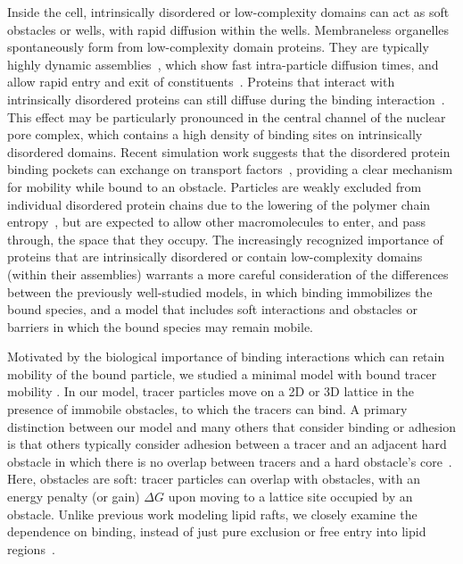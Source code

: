 Inside the cell, intrinsically disordered or low-complexity domains can act as
soft obstacles or wells, with rapid diffusion within the wells.  Membraneless
organelles spontaneously form from low-complexity domain proteins. They are
typically highly dynamic assemblies~\cite{brangwynne_germline_09}, which show
fast intra-particle diffusion times, and allow rapid entry and exit of
constituents~\cite{molliex_phase_15}.  Proteins that interact with
intrinsically disordered proteins can still diffuse during the binding
interaction~\cite{hough_molecular_15, raveh_slideandexchange_16}.  This effect
may be particularly pronounced in the central channel of the nuclear pore
complex, which contains a high density of binding sites on intrinsically
disordered domains.  Recent simulation work suggests that the disordered protein
binding pockets can exchange on transport
factors~\cite{raveh_slideandexchange_16}, providing a clear mechanism for
mobility while bound to an obstacle.  Particles are weakly excluded from
individual disordered protein chains due to the lowering of the polymer chain
entropy~\cite{timney_simple_16}, but are expected to allow other macromolecules
to enter, and pass through, the space that they occupy.  The increasingly
recognized importance of proteins that are intrinsically disordered or contain
low-complexity domains (within their assemblies) warrants a more careful
consideration of the differences between the previously well-studied models, in
which binding immobilizes the bound species, and a model that includes soft
interactions and obstacles or barriers in which the bound species may remain
mobile.

Motivated by the biological importance of binding interactions which can retain
mobility of the bound particle, we studied a minimal model with bound tracer
mobility . In our model, tracer particles move on a 2D
or 3D lattice in the presence of immobile obstacles, to which the tracers can
bind.  A primary distinction between our model and many others that consider
binding or adhesion is that others typically consider adhesion between a tracer
and an adjacent hard obstacle in which there is no overlap between tracers and
a hard obstacle's core~\cite{saxton_anomalous_96, wedemeier_how_09,
  ellery_analytical_16}.  Here, obstacles are soft: tracer particles can overlap
with obstacles, with an energy penalty (or gain) $\Delta G$ upon moving to a
lattice site occupied by an obstacle. Unlike previous work modeling lipid rafts,
we closely examine the dependence on binding, instead of just pure exclusion or
free entry into lipid regions~\cite{nicolau_sources_07}.

